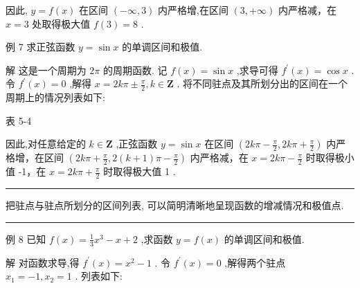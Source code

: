\documentclass[10pt]{article}
\newcommand{\HRule}{\begin{center}\rule{0.9\linewidth}{0.2mm}\end{center}}
\begin{document}
因此, \(y = f\left( x\right)\) 在区间 \(\left( {-\infty ,3}\right)\) 内严格增,在区间 \(\left( {3, + \infty }\right)\) 内严格减，在 \(x = 3\) 处取得极大值 \(f\left( 3\right)  = 8\) .

例 7 求正弦函数 \(y = \sin x\) 的单调区间和极值.

解 这是一个周期为 \({2\pi }\) 的周期函数. 记 \(f\left( x\right)  = \sin x\) ,求导可得 \({f}^{\prime }\left( x\right)  = \cos x\) . 令 \({f}^{\prime }\left( x\right)  = 0\) ,解得 \(x = {2k\pi } \pm  \frac{\pi }{2},k \in  \mathbf{Z}\) . 将不同驻点及其所划分出的区间在一个周期上的情况列表如下:

表 5-4

\begin{center}
\end{center}

因此,对任意给定的 \(k \in  \mathbf{Z}\) ,正弦函数 \(y = \sin x\) 在区间 \(\left( {{2k\pi } - \frac{\pi }{2},{2k\pi } + \frac{\pi }{2}}\right)\) 内严格增，在区间 \(\left( {{2k\pi } + \frac{\pi }{2},2\left( {k + 1}\right) \pi  - \frac{\pi }{2}}\right)\) 内严格减，在 \(x = {2k\pi } - \frac{\pi }{2}\) 时取得极小值 -1，在 \(x = {2k\pi } + \frac{\pi }{2}\) 时取得极大值 1 .

\HRule

把驻点与驻点所划分的区间列表, 可以简明清晰地呈现函数的增减情况和极值点.

\HRule

例 8 已知 \(f\left( x\right)  = \frac{1}{3}{x}^{3} - x + 2\) ,求函数 \(y = f\left( x\right)\) 的单调区间和极值.

解 对函数求导,得 \({f}^{\prime }\left( x\right)  = {x}^{2} - 1\) . 令 \({f}^{\prime }\left( x\right)  = 0\) ,解得两个驻点 \({x}_{1} =  - 1,{x}_{2} = 1\) . 列表如下:
\end{document}
